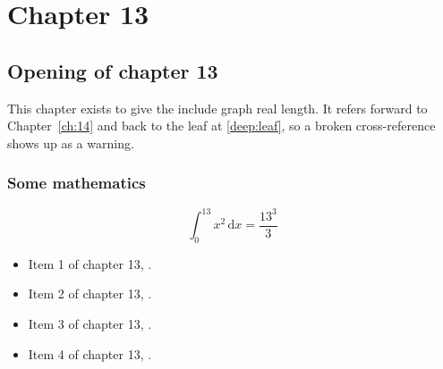 \chapter{Chapter 13}
\label{ch:13}
\section{Opening of chapter 13}
This chapter exists to give the include graph real length. It refers
forward to Chapter~\ref{ch:14} and back to the leaf
at \ref{deep:leaf}, so a broken cross-reference shows up as a warning.

\subsection{Some mathematics}
\begin{equation}
  \int_0^{13} x^{2} \, \mathrm{d}x = \frac{13^{3}}{3}
\end{equation}

\begin{itemize}
  \item Item 1 of chapter 13, .
  \item Item 2 of chapter 13, .
  \item Item 3 of chapter 13, .
  \item Item 4 of chapter 13, .
\end{itemize}
